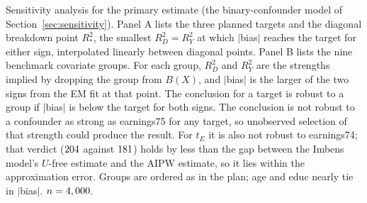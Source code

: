 \documentclass[11pt]{article}
\begin{document}
\begin{table}[tbp]
\centering
\caption{Sensitivity analysis for the primary estimate (the binary-confounder model of
Section~\ref{sec:sensitivity}). Panel A lists the
three planned targets and the diagonal breakdown point $R^2_*$, the smallest
$R^2_D = R^2_Y$ at which $|$bias$|$ reaches the target for either sign, interpolated
linearly between diagonal points. Panel B lists the nine benchmark covariate groups. For each
group, $R^2_D$ and $R^2_Y$ are the strengths implied by dropping the group from $B(X)$, and
$|$bias$|$ is the larger of the two signs from the EM fit at that point. The conclusion for a
target is robust to a group if $|$bias$|$ is below the target for both signs. The
conclusion is not robust to a confounder as strong as earnings75 for any target, so
unobserved selection of that strength could produce the result. For $t_E$ it is also not
robust to earnings74; that verdict ($\SensBenchEarnSeventyFourBias$ against
$\SensTargetEquiv$) holds by less than the gap between the Imbens model's $U$-free estimate
and the AIPW estimate, so it lies within the approximation error. Groups are ordered as in
the plan; age and educ nearly tie in $|$bias$|$. $n = \PrimaryN$.}
\label{tab:sensitivity}
\small
\setlength{\tabcolsep}{4pt}

\end{table}
\end{document}
